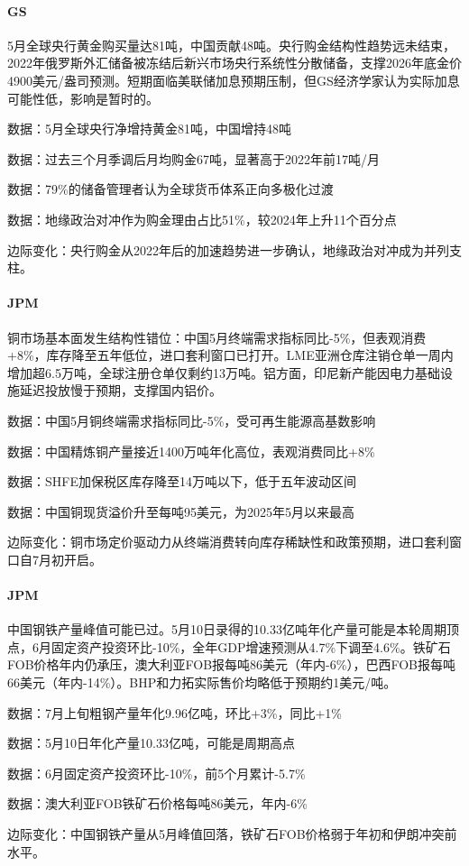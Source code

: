 \documentclass[11pt]{ctexart}
\begin{document}
\paragraph{GS} 5月全球央行黄金购买量达81吨，中国贡献48吨。央行购金结构性趋势远未结束，2022年俄罗斯外汇储备被冻结后新兴市场央行系统性分散储备，支撑2026年底金价4900美元/盎司预测。短期面临美联储加息预期压制，但GS经济学家认为实际加息可能性低，影响是暂时的。
{\small\color{refgray}数据：5月全球央行净增持黄金81吨，中国增持48吨\par}
{\small\color{refgray}数据：过去三个月季调后月均购金67吨，显著高于2022年前17吨/月\par}
{\small\color{refgray}数据：79\%的储备管理者认为全球货币体系正向多极化过渡\par}
{\small\color{refgray}数据：地缘政治对冲作为购金理由占比51\%，较2024年上升11个百分点\par}
{\small\color{refgray}边际变化：央行购金从2022年后的加速趋势进一步确认，地缘政治对冲成为并列支柱。\par}
\paragraph{JPM} 铜市场基本面发生结构性错位：中国5月终端需求指标同比-5\%，但表观消费+8\%，库存降至五年低位，进口套利窗口已打开。LME亚洲仓库注销仓单一周内增加超6.5万吨，全球注册仓单仅剩约13万吨。铝方面，印尼新产能因电力基础设施延迟投放慢于预期，支撑国内铝价。
{\small\color{refgray}数据：中国5月铜终端需求指标同比-5\%，受可再生能源高基数影响\par}
{\small\color{refgray}数据：中国精炼铜产量接近1400万吨年化高位，表观消费同比+8\%\par}
{\small\color{refgray}数据：SHFE加保税区库存降至14万吨以下，低于五年波动区间\par}
{\small\color{refgray}数据：中国铜现货溢价升至每吨95美元，为2025年5月以来最高\par}
{\small\color{refgray}边际变化：铜市场定价驱动力从终端消费转向库存稀缺性和政策预期，进口套利窗口自7月初开启。\par}
\paragraph{JPM} 中国钢铁产量峰值可能已过。5月10日录得的10.33亿吨年化产量可能是本轮周期顶点，6月固定资产投资环比-10\%，全年GDP增速预测从4.7\%下调至4.6\%。铁矿石FOB价格年内仍承压，澳大利亚FOB报每吨86美元（年内-6\%），巴西FOB报每吨66美元（年内-14\%）。BHP和力拓实际售价均略低于预期约1美元/吨。
{\small\color{refgray}数据：7月上旬粗钢产量年化9.96亿吨，环比+3\%，同比+1\%\par}
{\small\color{refgray}数据：5月10日年化产量10.33亿吨，可能是周期高点\par}
{\small\color{refgray}数据：6月固定资产投资环比-10\%，前5个月累计-5.7\%\par}
{\small\color{refgray}数据：澳大利亚FOB铁矿石价格每吨86美元，年内-6\%\par}
{\small\color{refgray}边际变化：中国钢铁产量从5月峰值回落，铁矿石FOB价格弱于年初和伊朗冲突前水平。\par}
\end{document}
